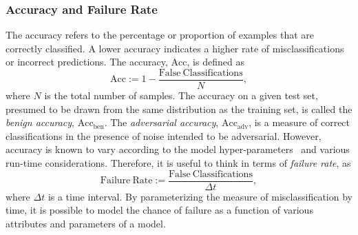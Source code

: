 \subsubsection{Accuracy and Failure Rate}
The accuracy refers to the percentage or proportion of examples that are correctly classified.
A lower accuracy indicates a higher rate of misclassifications or incorrect predictions.
The accuracy, $\mathrm{Acc}$, is defined as
\begin{equation}
    \mathrm{Acc} := 1 - \frac{\mathrm{False~Classifications}}{N},
    \label{eq:acc}
\end{equation}
where $N$ is the total number of samples.
The accuracy on a given test set, presumed to be drawn from the same distribution as the training set, is called the \textit{benign accuracy}, $\mathrm{Acc}_{\mathrm{ben}}$.
The \textit{adversarial accuracy}, $\mathrm{Acc}_{\mathrm{adv}}$, is a measure of correct classifications in the presence of noise intended to be adversarial.
However, accuracy is known to vary according to the model hyper-parameters~\cite{shalev2014understanding} and various run-time considerations.
Therefore, it is useful to think in terms of \textit{failure rate}, as
\begin{equation}
    \mathrm{Failure~Rate} := \frac{\mathrm{False~Classifications}}{\Delta t} ,
    \label{eq:failure_rate}
\end{equation}
where $\Delta t$ is a time interval.
By parameterizing the measure of misclassification by time, it is possible to model the chance of failure as a function of various attributes and parameters of a model.

